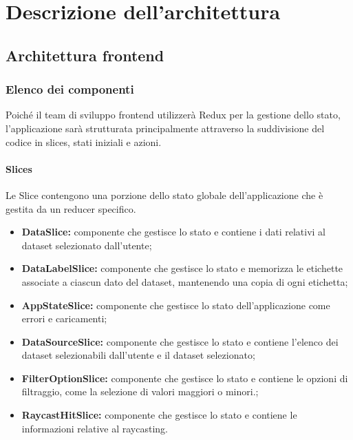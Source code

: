 \section{Descrizione dell'architettura}
\subsection{Architettura frontend}
\subsubsection{Elenco dei componenti}
Poiché il team di sviluppo frontend utilizzerà Redux per la gestione dello stato, l'applicazione sarà strutturata principalmente attraverso la suddivisione del codice in slices, stati iniziali e azioni.
\paragraph{Slices}
    Le Slice contengono una porzione dello stato globale dell’applicazione che è gestita da un reducer
    specifico.
\begin{itemize}
        \item \textbf{DataSlice:} componente che gestisce lo stato e contiene i dati relativi al dataset selezionato dall'utente;
        \item \textbf{DataLabelSlice:} componente che gestisce lo stato e memorizza le etichette associate a ciascun dato del dataset, mantenendo una copia di ogni etichetta;
        \item \textbf{AppStateSlice:} componente che gestisce lo stato dell'applicazione come errori e caricamenti;
        \item \textbf{DataSourceSlice:} componente che gestisce lo stato e contiene l'elenco dei dataset selezionabili dall'utente e il dataset selezionato;
        \item \textbf{FilterOptionSlice:} componente che gestisce lo stato e contiene le opzioni di filtraggio, come la selezione di valori maggiori o minori.;
        \item \textbf{RaycastHitSlice:} componente che gestisce lo stato e contiene le informazioni relative al raycasting.
\end{itemize}
